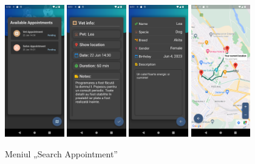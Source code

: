 \begin{figure}[ht]
    \centering
    \includegraphics[width=0.23\textwidth]{images/screenshots/available_appointments.png}
    \includegraphics[width=0.23\textwidth]{images/screenshots/appointment_info.png}
    \includegraphics[width=0.23\textwidth]{images/screenshots/pet_info.png}
    \includegraphics[width=0.23\textwidth]{images/screenshots/show_location.png}
    \caption{Meniul „Search Appointment”}
    \label{fig:schedule_appointment}
\end{figure}

